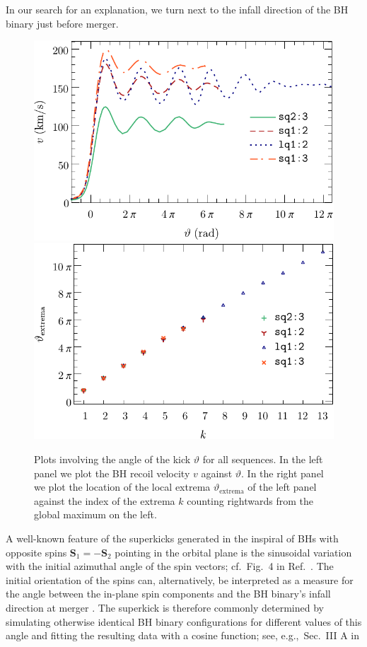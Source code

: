 In our search for an explanation, we turn next to the infall direction
of the BH binary just before merger.
%
%
\begin{figure}[t]
    \subfloat%
    {
    \includegraphics[width=0.5\columnwidth]{bhkick/kick-theta.pdf}
    \label{bhkick:fig:kick-theta}
    }
    \hfill
    \subfloat%
    {
    \includegraphics[width=0.5\columnwidth]{bhkick/theta-extrema.pdf}
    \label{bhkick:fig:theta-extrema}
    }
    \caption{
    Plots involving the angle of the kick $\vartheta$ for 
    all sequences. In the left panel we plot the BH recoil 
    velocity $v$ against $\vartheta$. In the right panel we plot the location of the local extrema $\vartheta_\text{extrema}$ 
    of the left panel against the index of the extrema $k$ counting rightwards from
    the global maximum on the left.
    }
    \label{bhkick:fig:theta-plots}
\end{figure}
%
A well-known feature of the superkicks generated in the inspiral
of BHs with opposite spins $\boldsymbol{S}_1=-\boldsymbol{S}_2$
pointing in the orbital
plane is the sinusoidal variation with the initial azimuthal angle
of the spin vectors; cf.~Fig.~4 in Ref.~\cite{Bruegmann:2007zj}.
The initial orientation of the spins can, alternatively, be
interpreted as a measure for the angle between the in-plane
spin components and the BH binary's infall direction at merger
\cite{Lousto:2009ka}. The superkick is therefore commonly
determined by simulating otherwise identical BH binary configurations
for different values of this angle and fitting the resulting data
with a cosine function; see, e.g.,~Sec.~III A in
